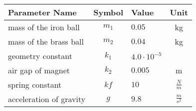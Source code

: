 \begin{tabular}{lclc}
\hline
 Parameter Name          &  Symbol  & Value               &      Unit       \\
\hline
 mass of the iron ball   & $m_{1}$  & $0.05$              &       kg        \\
 mass of the brass ball  & $m_{2}$  & $0.04$              &       kg        \\
 geometry constant       & $k_{1}$  & $4.0 \cdot 10^{-5}$ &                 \\
 air gap of magnet       & $k_{2}$  & $0.005$             &        m        \\
 spring constant         &   $kf$   & $10$                &  $\frac{N}{m}$  \\
 acceleration of gravity &   $g$    & $9.8$               & $\frac{m}{s^2}$ \\
\hline
\end{tabular}
